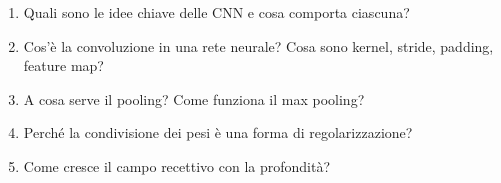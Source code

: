 \begin{domande}
\begin{enumerate}
  \item Quali sono le idee chiave delle CNN e cosa comporta ciascuna?
  \item Cos'è la convoluzione in una rete neurale? Cosa sono kernel, stride, padding, feature map?
  \item A cosa serve il pooling? Come funziona il max pooling?
  \item Perché la condivisione dei pesi è una forma di regolarizzazione?
  \item Come cresce il campo recettivo con la profondità?
\end{enumerate}
\end{domande}
